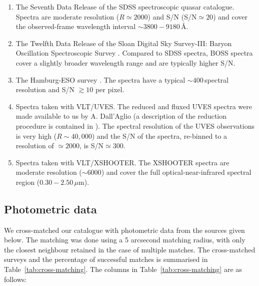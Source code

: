 \begin{enumerate}

 \item The Seventh Data Release \citep[DR7;][]{schneider10} of the SDSS spectroscopic quasar catalogue. Spectra are moderate resolution ($R\simeq2000$) and S/N (S/N$\simeq20$) and cover the observed-frame wavelength interval $\sim3800-9180$\,\AA.   
 
 \item The Twelfth Data Release \citep[DR12;][]{paris17} of the Sloan Digital Sky Survey-III: Baryon Oscillation Spectroscopic Survey \citep[SDSS-III/BOSS;][]{dawson13}. Compared to SDSS spectra, BOSS spectra cover a slightly broader wavelength range and are typically higher S/N. 

 \item The Hamburg-ESO survey \citep{wisotzki00}. The spectra have a typical $\sim400$\,\kms spectral resolution and S/N $\gtrsim10$ per pixel. 

 \item Spectra taken with VLT/UVES. The reduced and fluxed UVES spectra were made available to us by A. Dall'Aglio (a description of the reduction procedure is contained in \citealt{dallaglio08}). The spectral resolution of the UVES observations is very high ($R\sim40,000$) and the S/N of the spectra, re-binned to a resolution of $\simeq2000$, is S/N$\simeq300$. 

 \item Spectra taken with VLT/XSHOOTER. The XSHOOTER spectra are moderate resolution ($\sim6000$) and cover the full optical-near-infrared spectral region ($0.30-2.50$\,$\mu$m). 

\end{enumerate}

\subsection{Photometric data}

We cross-matched our catalogue with photometric data from the sources given below. 
The matching was done using a 5 arcsecond matching radius, with only the closest neighbour retained in the case of multiple matches. 
The cross-matched surveys and the percentage of successful matches is summarised in Table~\ref{tab:cross-matching}. 
The columns in Table~\ref{tab:cross-matching} are as follows:

